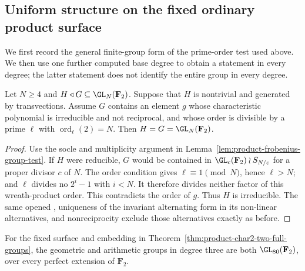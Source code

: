 \subsection{Uniform structure on the fixed ordinary product surface}
\label{subsec:product-uniform-structure}

We first record the general finite-group form of the prime-order
test used above.  We then use one further computed base degree to
obtain a statement in every degree; the latter statement does not
identify the entire group in every degree.

\begin{lemma}\label{lem:primitive-prime-transvection-test}
Let $N\ge4$ and $H\triangleleft G\subseteq\GL_N(\mathbf F_2)$.
Suppose that $H$ is nontrivial and generated by transvections.
Assume $G$ contains an element $g$ whose characteristic polynomial
is irreducible and not reciprocal, and whose order is divisible
by a prime $\ell$ with $\operatorname{ord}_{\ell}(2)=N$.
Then $H=G=\GL_N(\mathbf F_2)$.
\end{lemma}

\begin{proof}
Use the socle and multiplicity argument in
Lemma~\ref{lem:product-frobenius-group-test}.
If $H$ were reducible, $G$ would be contained in
$\GL_c(\mathbf F_2)\wr S_{N/c}$ for a proper divisor $c$ of $N$.
The order condition gives $\ell\equiv1\pmod N$, hence $\ell>N$;
and $\ell$ divides no $2^i-1$ with $i<N$.
It therefore divides neither factor of this wreath-product order.
This contradicts the order of $g$.
Thus $H$ is irreducible.  The same opened
\cite[Theorem~3.6, p.~22]{KantorSeress2001}, uniqueness of the
invariant alternating form in its non-linear alternatives, and
nonreciprocity exclude those alternatives exactly as before.
\end{proof}

\begin{corollary}\label{cor:product-degree-three-full-group}
For the fixed surface and embedding in
Theorem~\ref{thm:product-char2-two-full-groups}, the geometric and
arithmetic groups in degree three are both
$\GL_{80}(\mathbf F_2)$, over every perfect extension of
$\mathbf F_2$.
\end{corollary}

